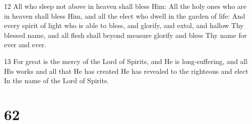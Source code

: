 \par 12 All who sleep not above in heaven shall bless Him: All the holy ones who are in heaven shall bless Him, and all the elect who dwell in the garden of life: And every spirit of light who is able to bless, and glorify, and extol, and hallow Thy blessed name, and all flesh shall beyond measure glorify and bless Thy name for ever and ever.
\par 13 For great is the mercy of the Lord of Spirits, and He is long-suffering, and all His works and all that He has created He has revealed to the righteous and elect In the name of the Lord of Spirits.

\chapter{62}

